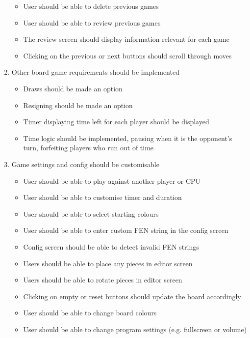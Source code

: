\documentclass[../main/main.tex]{subfiles}
\begin{document}
\begin{enumerate}
\begin{itemize}
    \item User should be able to delete previous games
    \item User should be able to review previous games
    \item The review screen should display information relevant for each game
    \item Clicking on the previous or next buttons should scroll through moves
    \end{itemize}
\item Other board game requirements should be implemented
    \begin{itemize}
    \item Draws should be made an option
    \item Resigning should be made an option
    \item Timer displaying time left for each player should be displayed
    \item Time logic should be implemented, pausing when it is the opponent’s turn, forfeiting players who run out of time
    \end{itemize}
\item Game settings and config should be customisable
    \begin{itemize}
    \item User should be able to play against another player or CPU
    \item User should be able to customise timer and duration
    \item User should be able to select starting colours
    \item User should be able to enter custom FEN string in the config screen
    \item Config screen should be able to detect invalid FEN strings
    \item Users should be able to place any pieces in editor screen
    \item Users should be able to rotate pieces in editor screen
    \item Clicking on empty or reset buttons should update the board accordingly
    \item User should be able to change board colours
    \item User should be able to change program settings (e.g. fullscreen or volume)
    \end{itemize}

\end{enumerate}
\end{document}
